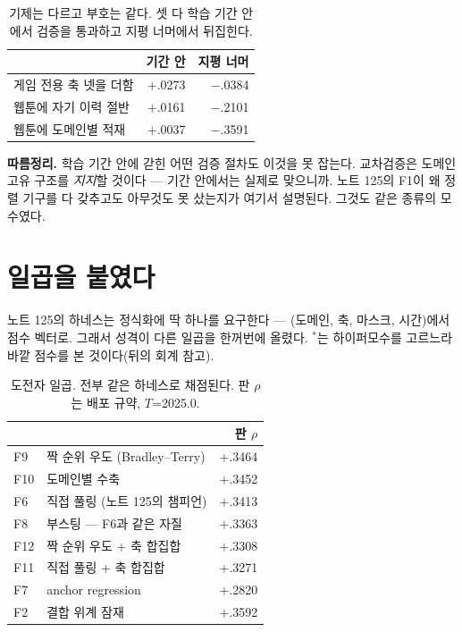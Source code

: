 \documentclass[10pt]{article}
\begin{document}
\begin{table}[t]
\centering\tsize
\caption{기제는 다르고 부호는 같다. 셋 다 학습 기간 안에서 검증을 통과하고
지평 너머에서 뒤집힌다.}
\begin{tabular}{lrr}
\toprule
& 기간 안 & 지평 너머 \\
\midrule
게임 전용 축 넷을 더함 & $+$.0273 & $-$.0384 \\
웹툰에 자기 이력 절반 & $+$.0161 & $-$.2101 \\
웹툰에 도메인별 적재 & $+$.0037 & $-$.3591 \\
\bottomrule
\end{tabular}
\end{table}


\textbf{따름정리.} 학습 기간 안에 갇힌 어떤 검증 절차도 이것을 못 잡는다.
교차검증은 도메인 고유 구조를 \emph{지지}할 것이다 --- 기간 안에서는
실제로 맞으니까. 노트 125의 F1이 왜 정렬 기구를 다 갖추고도 아무것도
못 샀는지가 여기서 설명된다. 그것도 같은 종류의 모수였다.

\section{일곱을 붙였다}

노트 125의 하네스는 정식화에 딱 하나를 요구한다 --- (도메인, 축, 마스크,
시간)에서 점수 벡터로. 그래서 성격이 다른 일곱을 한꺼번에 올렸다.
$^{*}$는 하이퍼모수를 고르느라 바깥 점수를 본 것이다(뒤의 회계 참고).

\begin{table}[t]
\centering\tsize
\caption{도전자 일곱. 전부 같은 하네스로 채점된다.
판 $\rho$는 배포 규약, $T$=2025.0.}
\begin{tabular}{llr}
\toprule
& & 판 $\rho$ \\
\midrule
F9 & 짝 순위 우도 (Bradley--Terry) & $+$.3464 \\
F10 & 도메인별 수축 & $+$.3452\rlap{$^{*}$} \\
F6 & 직접 풀링 (노트 125의 챔피언) & $+$.3413 \\
F8 & 부스팅 --- F6과 같은 자질 & $+$.3363 \\
F12 & 짝 순위 우도 $+$ 축 합집합 & $+$.3308 \\
F11 & 직접 풀링 $+$ 축 합집합 & $+$.3271 \\
F7 & anchor regression & $+$.2820 \\
\midrule
F2 & 결합 위계 잠재 & $+$.3592\rlap{$^{*}$} \\
\bottomrule
\end{tabular}
\end{table}
\end{document}

